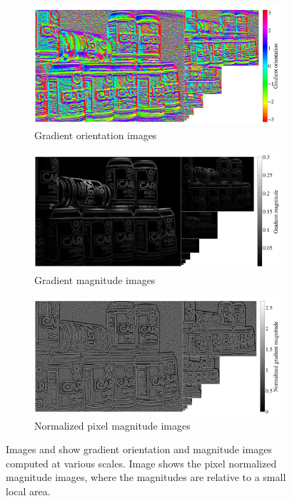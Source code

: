 \documentclass[thesis.tex]{subfiles}
\begin{document}
\begin{figure}[p]
    \centering
    \begin{subfigure}[t]{0.97\textwidth}
		\includegraphics[width=\textwidth]{img/cellHistScaleSpacesV.pdf}
    	\caption{Gradient orientation images }
    	\label{fig:cellHistScaleSpacesV}
	\end{subfigure}
    \begin{subfigure}[t]{0.97\textwidth}
		\includegraphics[width=\textwidth]{img/cellHistScaleSpacesM.pdf}
    	\caption{Gradient magnitude images}
    	\label{fig:cellHistScaleSpacesM}
	\end{subfigure}
	\begin{subfigure}[t]{0.97\textwidth}
		\includegraphics[width=\textwidth]{img/cellHistScaleSpacesMnorm.pdf}
    	\caption{Normalized pixel magnitude images}
    	\label{fig:cellHistScaleSpacesMnorm}
	\end{subfigure}
	\caption{Images  and  show gradient orientation and magnitude images computed at various scales. Image  shows the pixel normalized magnitude images, where the magnitudes are relative to a small local area.}
	\label{fig:cellHistScaleSpacesVM}
\end{figure}
\end{document}
